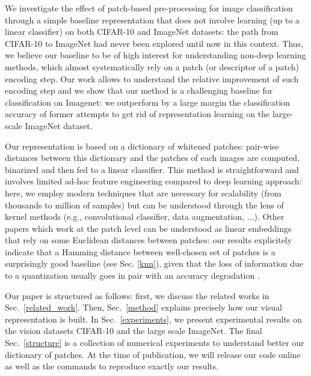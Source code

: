 \documentclass{article}
\begin{document}
We investigate the effect of patch-based pre-processing for image classification through a simple baseline representation that does not involve learning  (up to a linear classifier) on both CIFAR-10 and ImageNet datasets: the path from CIFAR-10 to ImageNet had never been explored until now in this context.  Thus, we believe our baseline to be of high interest for understanding non-deep learning methods, which almost systematically rely on a patch (or descriptor of a patch) encoding step. Our work allows to understand the relative improvement of such encoding step and we show that our method is a challenging baseline for classification on Imagenet:  we outperform by a large margin the classification accuracy of former attempts to get rid of representation learning on the large-scale ImageNet dataset.


Our representation is based on a dictionary of whitened patches: pair-wise distances between this dictionary and the patches of each images are computed, binarized and then fed to a linear classifier. This method is  straightforward and involves limited ad-hoc feature engineering compared to deep learning approach: here, we  employ modern  techniques that are necessary for scalability (from thousands to million of samples) but can be understood through the lens of kernel methods (e.g., convolutional classifier, data augmentation, ...). 
Other papers which work at the patch level can be understood as linear embeddings that rely on some Euclidean distances between patches: our results explicitely indicate that a Hamming distance between well-chosen set of patches is a surprisingly good baseline (see Sec. \ref{knn}), given that the loss of information due to a quantization usually goes in pair with an accuracy degradation \citep{coates2011analysis}.

Our paper is structured as follows: first, we discuss the related works in Sec.~\ref{related_work}. Then, Sec.~\ref{method} explains precisely how our visual representation is built. In Sec.~\ref{experiments}, we present experimental results on the vision datasets CIFAR-10 and the large scale  ImageNet. The final Sec.~\ref{structure} is a collection of numerical experiments to understand better our dictionary of patches. At the time of publication, we will release our code online as well as the commands to reproduce exactly our results.
\end{document}
